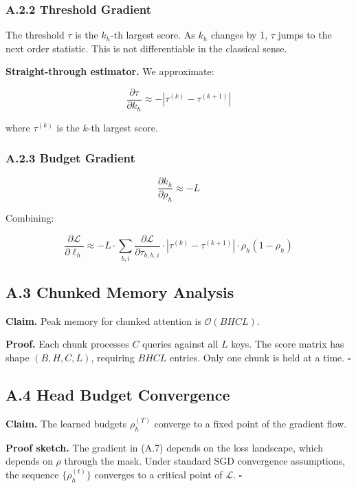 \subsubsection{A.2.2 Threshold Gradient}

The threshold $\tau$ is the $k_h$-th largest score. As $k_h$ changes by 1, 
$\tau$ jumps to the next order statistic. This is not differentiable in 
the classical sense.

\textbf{Straight-through estimator.} We approximate:

\[
\frac{\partial \tau}{\partial k_h} \approx -|\tau^{(k)} - \tau^{(k+1)}|
\]

where $\tau^{(k)}$ is the $k$-th largest score.

\subsubsection{A.2.3 Budget Gradient}

\[
\frac{\partial k_h}{\partial \rho_h} \approx -L
\]

Combining:

\[
\frac{\partial \mathcal{L}}{\partial \ell_h} \approx -L \cdot \sum_{b, i} \frac{\partial \mathcal{L}}{\partial \tau_{b, h, i}} \cdot |\tau^{(k)} - \tau^{(k+1)}| \cdot \rho_h (1 - \rho_h)
\]

\subsection{A.3 Chunked Memory Analysis}

\textbf{Claim.} Peak memory for chunked attention is $\mathcal{O}(B H C L)$.

\textbf{Proof.} Each chunk processes $C$ queries against all $L$ keys. The score 
matrix has shape $(B, H, C, L)$, requiring $B H C L$ entries. Only one chunk 
is held at a time. $\square$

\subsection{A.4 Head Budget Convergence}

\textbf{Claim.} The learned budgets $\rho_h^{(T)}$ converge to a fixed point of 
the gradient flow.

\textbf{Proof sketch.} The gradient in (A.7) depends on the loss landscape, which 
depends on $\rho$ through the mask. Under standard SGD convergence 
assumptions, the sequence $\{\rho_h^{(t)}\}$ converges to a critical point 
of $\mathcal{L}$. $\square$

